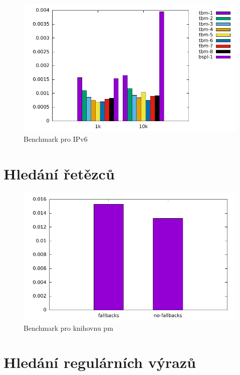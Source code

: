 \begin{figure}[!htb]
	\centering
	\includegraphics[scale=1]{fig/lpm-ipv6.pdf}
	\caption{Benchmark pro IPv6}
\end{figure}\label{fig:lpm-ipv4}

\section{Hledání řetězců}

\begin{figure}[!htb]
	\centering
	\includegraphics[scale=0.7]{fig/pm.pdf}
	\caption{Benchmark pro knihovnu pm}
\end{figure}\label{fig:pm}

\section{Hledání regulárních výrazů}


